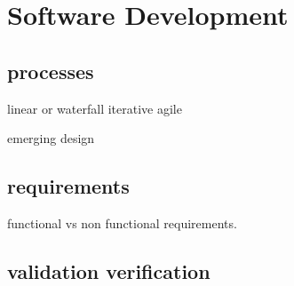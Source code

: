 \documentclass[\docroot/main]{subfiles}
\begin{document}
\chapter{Software Development}
\section{processes}
linear or waterfall
iterative
agile

emerging design



\section{requirements}

functional vs non functional requirements.

\section{validation verification}
\end{document}
